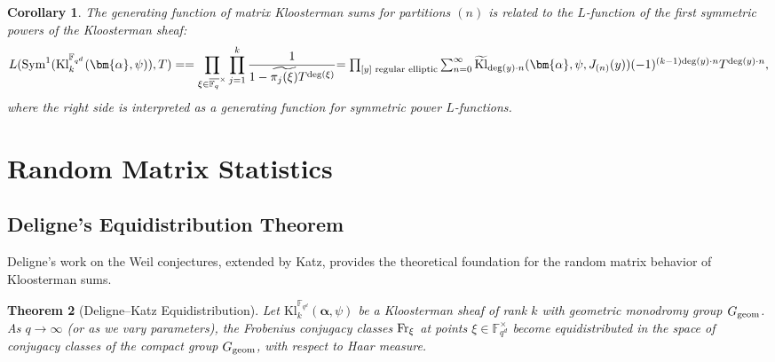 \documentclass[11pt]{article}
\newtheorem{theorem}{Theorem}[section]
\newtheorem{corollary}[theorem]{Corollary}
\newcommand{\Fqd}{\mathbb{F}_{q^d}}
\newcommand{\Kl}{\mathrm{Kl}}
\newcommand{\Sym}{\mathrm{Sym}}
\begin{document}
\begin{corollary}
The generating function of matrix Kloosterman sums for partitions $(n)$ is related to the $L$-function of the first symmetric powers of the Kloosterman sheaf:
\[
L(\Sym^1(\Kl_k^{\Fqd}(\bm{\alpha},\psi)), T)==\prod_{\xi\in\overline{\mathbb{F}_{q}}^{\times}}\prod_{j=1}^k\frac{1}{1-\widetilde{\pi_j(\xi)}T^{{\rm deg}(\xi)}}
$$
$$
=\prod_{[y] \text{ regular elliptic}}\sum_{n=0}^{\infty}\widetilde{\operatorname{Kl}}_{{\rm deg}(y)\cdot n}(\bm{\alpha}, \psi, J_{(n)}(y))(-1)^{(k-1){\rm deg}(y)\cdot n}T^{{\rm deg}(y)\cdot n},
\]
where the right side is interpreted as a generating function for symmetric power $L$-functions.
\end{corollary}

\section{Random Matrix Statistics}
\label{sec:random_matrix}

\subsection{Deligne's Equidistribution Theorem}

Deligne's work on the Weil conjectures, extended by Katz, provides the theoretical foundation for the random matrix behavior of Kloosterman sums.
\medskip

\begin{theorem}[Deligne–Katz Equidistribution]\cite{Katz88}
Let $\Kl_k^{\Fqd}(\bm{\alpha},\psi)$ be a Kloosterman sheaf of rank $k$ with geometric monodromy group $G_{\rm geom}$. As $q \to \infty$ (or as we vary parameters), the Frobenius conjugacy classes ${\rm Fr}_\xi$ at points $\xi \in \Fqd^\times$ become equidistributed in the space of conjugacy classes of the compact group $G_{\rm geom}$, with respect to Haar measure.
\end{theorem}

%
\end{document}
